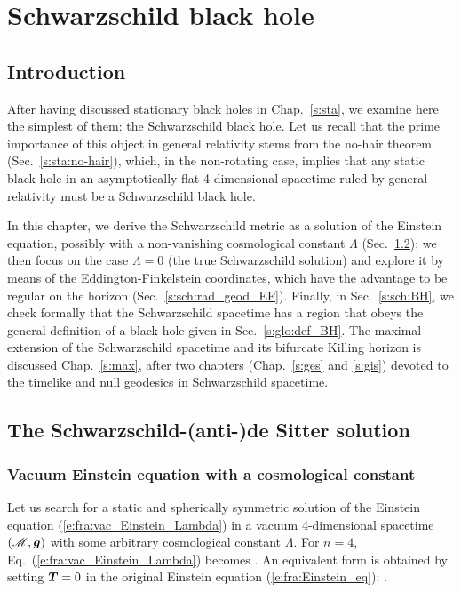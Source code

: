 \chapter{Schwarzschild black hole}
\label{s:sch}

\minitoc

\section{Introduction}

After having discussed stationary black holes in Chap.~\ref{s:sta},
we examine here the simplest of them: the Schwarzschild black hole.
Let us recall that the prime importance of this object
in general relativity stems from the no-hair theorem (Sec.~\ref{s:sta:no-hair}),
which, in the non-rotating case, implies that any static black hole in an asymptotically flat 4-dimensional spacetime ruled by general relativity must be a Schwarzschild black hole.

In this chapter, we derive the Schwarzschild metric as a solution of the
Einstein equation, possibly with a non-vanishing cosmological constant
$\Lambda$ (Sec.~\ref{s:sch:Sch_sol_lamb}); we then focus on the case $\Lambda=0$
(the true Schwarzschild solution) and explore it by means of the
Eddington-Finkelstein coordinates, which have
the advantage to be regular on the horizon (Sec.~\ref{s:sch:rad_geod_EF}).
Finally, in Sec.~\ref{s:sch:BH}, we check formally that the Schwarzschild spacetime has a region that obeys the general definition of a black hole given in
Sec.~\ref{s:glo:def_BH}. The maximal extension of the Schwarzschild
spacetime and its bifurcate Killing horizon
is discussed Chap.~\ref{s:max}, after two chapters (Chap.~\ref{s:ges} and \ref{s:gis})
devoted to the timelike and null geodesics in Schwarzschild
spacetime.

\section{The Schwarzschild-(anti-)de Sitter solution} \label{s:sch:Sch_sol_lamb}

\subsection{Vacuum Einstein equation with a cosmological constant}

Let us search for a static and spherically symmetric solution of the
Einstein equation (\ref{e:fra:vac_Einstein_Lambda}) in a vacuum
4-dimensional spacetime $(\mathscr{M},\bm{g})$ with some arbitrary cosmological constant
$\Lambda$. For $n=4$, Eq.~(\ref{e:fra:vac_Einstein_Lambda}) becomes
\be \label{e:sch:vac_Einstein_eq_Lamb}
     .
\ee
An equivalent form is obtained by setting $\bm{T}=0$
in the original Einstein equation (\ref{e:fra:Einstein_eq}):
\be \label{e:sch:vac_Einstein_eq}
     .
\ee

